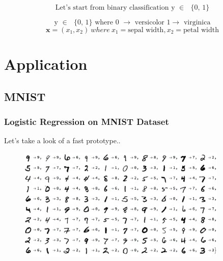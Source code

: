 \documentclass{beamer}
\begin{document}
\begin{frame}
\frametitle{}
\[\text{Let's start from binary classification y $\in $ $\{$0, 1$\}$}\]

\[\text{y $\in $ $\{$0, 1$\}$   where 0 $\to $ versicolor 1$\to $ virginica}\]
\[	
	\mathbf{x} = (x_ 1, x_ 2) \
		where \ x_1 = \text{sepal width}, x_2 = \text{petal width}\]
\end{frame}


\section{Application} 
\subsection{MNIST}
\begin{frame}
\frametitle{Logistic Regression on MNIST Dataset}
Let's take a look of a fast prototype..
\begin{figure}[t]
\includegraphics[width=10cm]{graphics/mnist}
\centering
\end{figure}
\end{frame}
\end{document}
